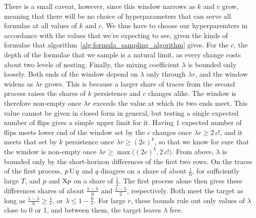 \documentclass[titlepage,a4paper,11pt]{report}
\begin{document}
    There is a small caveat, however, since this window narrows as $k$ and $c$ grow, meaning that there will be no choice of hyperparameters that can serve all formulae at all values of $k$ and $c$. We thus have to choose our hyperparemters in accordance with the values that we're expecting to see, given the kinds of formulae that algorithm~\ref{alg:formula_sampling_algorithm} gives. For the $c$, the depth of the formulae that we sample is a natural limit, as every change costs about two levels of nesting. Finally, the mixing coefficient $\lambda$ is bounded only loosely. Both ends of the window depend on $\lambda$ only through $\lambda r$, and the window widens as $\lambda r$ grows. This is because a larger share of traces from the second process raises the shares of $k$ persistence and $c$ changes alike. The window is therefore non-empty once $\lambda r$ exceeds the value at which its two ends meet. This value cannot be given in closed form in general, but testing a single expected number of flips gives a simple upper limit for it. Having $1$ expected number of flips meets lower end of the window set by the $c$ changes once $\lambda r\ge2\,c!$, and it meets that set by $k$ persistence once $\lambda r\ge(2e)^k$, so that we know for sure that the window is non-empty once $\lambda r\ge\max\bigl((2e)^k,2\,c!\bigr)$. From above, $\lambda$ is bounded only by the short-horizon differences of the first two rows. On the traces of the first process, $p\,\text{U}\,q$ and $q$ disagree on a share of about $\frac16$, for sufficiently large $T$, and $p$ and $\text{X} p$ on a share of $\frac12$. The first process alone then gives these differences shares of about $\frac{1-\lambda}{6}$ and $\frac{1-\lambda}{2}$, respectively. Both meet the target as long as $\frac{1-\lambda}{6}\ge\frac1r$, or $\lambda\le1-\frac6r$. For large $r$, these bounds rule out only values of $\lambda$ close to 0 or 1, and between them, the target leaves $\lambda$ free.
 
\end{document}
